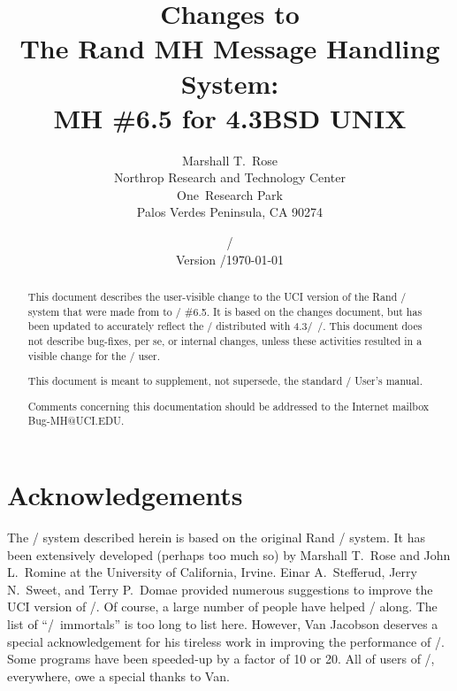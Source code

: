 





\title{Changes to\\ The Rand MH Message Handling System:\\
	MH \#6.5 for 4.3BSD UNIX}
\author{Marshall T.~Rose\\
	Northrop Research and Technology Center\\
	One~Research Park\\
	Palos Verdes Peninsula, CA  90274}
\date{\ifdraft \versiondate/\\ Version \versiontag/\else \today\fi}
\maketitle
{}

\begin{abstract}
This document describes the user-visible change to the
UCI version of the Rand \MH/ system that were made from  to \MH/ \#6.5.
It is based on the  changes document,
but has been updated to accurately reflect the \MH/ distributed with
4.3\bsd/~\unix/.
This document does not describe bug-fixes, per se,
or internal changes,
unless these activities resulted in a visible change for the \MH/ user.

This document is meant to supplement,
not supersede, the standard \MH/ User's manual\cite{MH.USR}.

Comments concerning this documentation should be addressed to the Internet
mailbox {\sf Bug-MH@UCI.EDU}.
\end{abstract}

\newpage
\section*	{Acknowledgements}
The \MH/ system described herein is based on the original Rand \MH/ system.
It has been extensively developed (perhaps too much so) by Marshall T.~Rose
and John L.~Romine at the University of California, Irvine.
Einar A.~Stefferud, Jerry N.~Sweet,
and Terry P.~Domae provided numerous suggestions
to improve the UCI version of \MH/.
Of course,
a large number of people have helped \MH/ along.
The list of ``\MH/~immortals'' is too long to list here.
However, Van Jacobson deserves a special acknowledgement for his tireless
work in improving the performance of \MH/.
Some programs have been speeded-up by a factor of 10 or 20.
All of users of \MH/, everywhere, owe a special thanks to Van.

